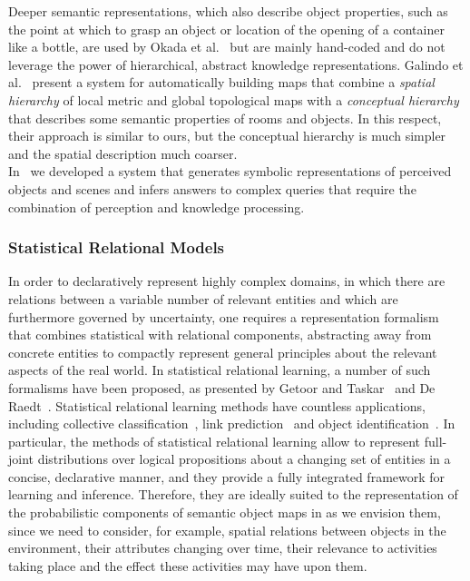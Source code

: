 Deeper semantic representations, which also describe object properties, such as the point at which to grasp
an object or location of the opening of a container like a bottle, are used by Okada et al.~\cite{okada2007iros} but are mainly hand-coded
and do not leverage the power of hierarchical, abstract knowledge representations.
Galindo et al.~\cite{galindo08taskplanning} present a system for automatically building maps that
combine a \emph{spatial hierarchy} of local metric and global topological maps with a \emph{conceptual
hierarchy} that describes some semantic properties of rooms and objects. In this respect, their approach is
similar to ours, but the conceptual hierarchy is much simpler and the spatial description much coarser.\\
In~\cite{iros10kcopman} we developed a system that generates symbolic representations
of perceived objects and scenes and infers answers to complex queries that require the combination of perception and knowledge
processing.

\subsubsection{Statistical Relational Models}
\label{sec:markov}

In order to declaratively represent highly complex domains, in which there are relations between a variable
number of relevant entities and which are furthermore governed by uncertainty, one requires a representation
formalism that combines statistical with relational components, abstracting away from concrete entities
to compactly represent general principles about the relevant aspects of the real world.
In statistical relational learning, a number of such formalisms have been proposed,
as presented by Getoor and Taskar~\cite{getoor07introduction} and De Raedt~\cite{DeRaedt08Learning}.
Statistical relational learning methods have countless applications, including collective classification~\cite{neville03collective},
link prediction~\cite{taskar03link} and object identification~\cite{singla06entity}.
In particular, the methods of statistical relational learning allow
to represent full-joint distributions over logical propositions about a changing set of entities in
a concise, declarative manner, and they provide a fully integrated framework for learning and inference. Therefore,
they are ideally suited to the representation of the probabilistic components of semantic object maps in \ksem as we envision them,
since we need to consider, for example, spatial relations between objects in the environment, their attributes
changing over time, their relevance to activities taking place and the effect these activities may have upon them.

